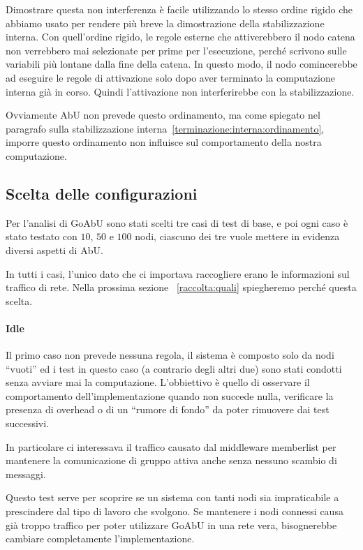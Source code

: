 \documentclass[12pt, a4paper]{article}
\begin{document}
    Dimostrare questa non interferenza è facile utilizzando lo stesso ordine rigido che abbiamo usato per rendere più breve la dimostrazione della stabilizzazione interna. Con quell'ordine rigido, le regole esterne che attiverebbero il nodo catena non verrebbero mai selezionate per prime per l'esecuzione, perché scrivono sulle variabili più lontane dalla fine della catena.
    In questo modo, il nodo comincerebbe ad eseguire le regole di attivazione solo dopo aver terminato la computazione interna già in corso. Quindi l'attivazione non interferirebbe con la stabilizzazione.

    Ovviamente AbU non prevede questo ordinamento, ma come spiegato nel paragrafo sulla stabilizzazione interna~\ref{terminazione:interna:ordinamento}, imporre questo ordinamento non influisce sul comportamento della nostra computazione.

    \subsection{Scelta delle configurazioni}

    Per l'analisi di GoAbU sono stati scelti tre casi di test di base, e poi ogni caso è stato testato con $10$, $50$ e $100$ nodi, ciascuno dei tre vuole mettere in evidenza diversi aspetti di AbU.

    In tutti i casi, l'unico dato che ci importava raccogliere erano le informazioni sul traffico di rete. Nella prossima sezione ~\ref{raccolta:quali} spiegheremo perché questa scelta.

    \paragraph{Idle}

    Il primo caso non prevede nessuna regola, il sistema è composto solo da nodi ``vuoti'' ed i test in questo caso (a contrario degli altri due) sono stati condotti senza avviare mai la computazione.
    L'obbiettivo è quello di osservare il comportamento dell'implementazione quando non succede nulla, verificare la presenza di overhead o di un ``rumore di fondo'' da poter rimuovere dai test successivi.

    In particolare ci interessava il traffico causato dal middleware memberlist per mantenere la comunicazione di gruppo attiva anche senza nessuno scambio di messaggi.

    Questo test serve per scoprire se un sistema con tanti nodi sia impraticabile a prescindere dal tipo di lavoro che svolgono. Se mantenere i nodi connessi causa già troppo traffico per poter utilizzare GoAbU in una rete vera, bisognerebbe cambiare completamente l'implementazione.
\end{document}
